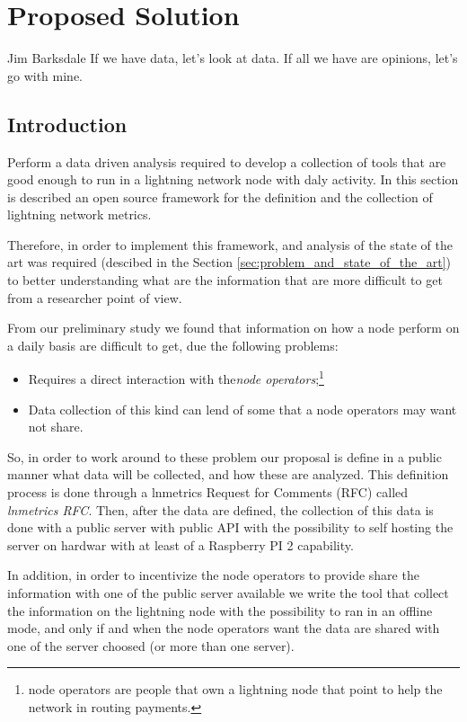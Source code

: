 \chapter{Proposed Solution}

\begin{chapquote}{Jim Barksdale}
If we have data, let’s look at data. If all we have are opinions, let’s go with mine.
\end{chapquote}

\section{Introduction}

Perform a data driven analysis required to develop a collection of tools
that are good enough to run in a lightning network node with daly activity. 
In this section is described an open source framework for the definition and 
the collection of lightning network metrics.

Therefore, in order to implement this framework, and analysis of the state 
of the art was required (descibed in the Section \ref{sec:problem_and_state_of_the_art})
to better understanding what are the information that are more difficult 
to get from a researcher point of view.

From our preliminary study we found that information on how a node perform 
on a daily basis are difficult to get, due the following problems:
\begin{itemize}
    \item Requires a direct interaction with the\emph{node operators};\footnote{node operators are people that own a lightning node that point to 
    help the network in routing payments.}
    \item Data collection of this kind can lend of some
    that a node operators may want not share.
\end{itemize}

So, in order to work around to these problem our proposal is define in a 
public manner what data will be collected, and how these are analyzed. This 
definition process is done through a lnmetrics Request for Comments (RFC) 
called \emph{lnmetrics RFC}. Then, after the data are defined, the collection 
of this data is done with a public server with public API with the possibility 
to self hosting the server on hardwar with at least of a Raspberry PI 2 capability.

In addition, in order to incentivize the node operators to provide share the 
information with one of the public server available we write the tool that 
collect the information on the lightning node with the possibility to ran 
in an offline mode, and only if and when the node operators want the data 
are shared with one of the server choosed (or more than one server).

